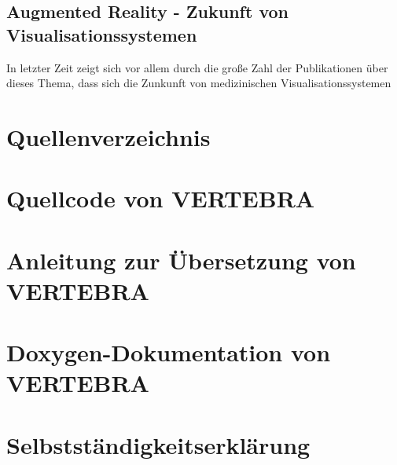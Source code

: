 \documentclass[a4paper]{scrartcl}
\begin{document}
\subsection{Augmented Reality - Zukunft von Visualisationssystemen}
In letzter Zeit zeigt sich vor allem durch die große Zahl der Publikationen über dieses Thema, dass sich die Zunkunft von medizinischen
Visualisationssystemen
\appendix
\section{Quellenverzeichnis}
\section{Quellcode von VERTEBRA}
\section{Anleitung zur Übersetzung von VERTEBRA}
\section{Doxygen-Dokumentation von VERTEBRA}
\section{Selbstständigkeitserklärung}


\end{document}
